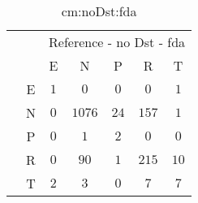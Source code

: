 \begin{table}[!ht]
	\centering
	\begin{tabular}{|c|c|c|c|c|c|c|}
		\cline{3-7}
		\multicolumn{2}{c|}{} & \multicolumn{5}{|c|}{Reference - no Dst - fda} \\ \cline{3-7}
		\multicolumn{2}{c|}{} & E & N & P & R & T \\ \hline
		\multirow{5}{*}{\rotatebox{90}{Prediction}} & E & $1$ & $0$ & $0$ & $0$ & $1$ \\ \cline{2-7}
		 & N & $0$ & $1076$ & $24$ & $157$ & $1$ \\ \cline{2-7}
		 & P & $0$ & $1$ & $2$ & $0$ & $0$ \\ \cline{2-7}
		 & R & $0$ & $90$ & $1$ & $215$ & $10$ \\ \cline{2-7}
		 & T & $2$ & $3$ & $0$ & $7$ & $7$ \\ \hline
	\end{tabular}
	\caption{cm:noDst:fda}
	\label{tab:cm:noDst:fda}
\end{table}
